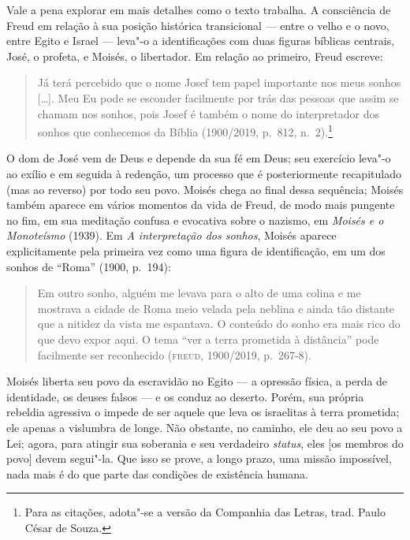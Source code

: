 Vale a pena explorar em mais detalhes como o texto trabalha. A
consciência de Freud em relação à sua posição histórica transicional ---
entre o velho e o novo, entre Egito e Israel --- leva"-o a identificações
com duas figuras bíblicas centrais, José, o profeta, e Moisés, o
libertador. Em relação ao primeiro, Freud escreve:

\begin{quote}
Já terá percebido que o nome Josef tem papel importante nos meus sonhos
{[}\ldots{}{]}. Meu Eu pode se esconder facilmente por trás das pessoas que
assim se chamam nos sonhos, pois Josef é também o nome do interpretador
dos sonhos que conhecemos da Bíblia (1900/2019, p.~812, n.~2).\footnote{Para as citações, adota"-se a versão da Companhia das Letras, trad. Paulo César de Souza.}
\end{quote}

O dom de José vem de Deus e depende da sua fé em Deus; seu exercício
leva"-o ao exílio e em seguida à redenção, um processo que é
posteriormente recapitulado (mas ao reverso) por todo seu povo. Moisés
chega ao final dessa sequência; Moisés também aparece em vários momentos
da vida de Freud, de modo mais pungente no fim, em sua meditação confusa
e evocativa sobre o nazismo, em \emph{Moisés e o Monoteísmo} (1939).
Em \emph{A interpretação dos sonhos}, Moisés aparece
explicitamente pela primeira vez como uma figura de identificação, em um
dos sonhos de ``Roma'' (1900, p.~194):

\begin{quote}
Em outro sonho, alguém me levava para o alto de uma colina e me mostrava
a cidade de Roma meio velada pela neblina e ainda tão distante que a
nitidez da vista me espantava. O conteúdo do sonho era mais rico do que
devo expor aqui. O tema ``ver a terra prometida à distância'' pode
facilmente ser reconhecido (\textsc{freud}, 1900/2019, p.~267-8).
\end{quote}

Moisés liberta seu povo da escravidão no Egito --- a opressão física, a
perda de identidade, os deuses falsos --- e os conduz ao deserto. Porém,
sua própria rebeldia agressiva o impede de ser aquele que leva os
israelitas à terra prometida; ele apenas a vislumbra de longe. Não
obstante, no caminho, ele deu ao seu povo a Lei; agora, para atingir sua
soberania e seu verdadeiro \emph{status}, eles {[}os membros do povo{]}
devem segui"-la. Que isso se prove, a longo prazo, uma missão impossível,
nada mais é do que parte das condições de existência humana.

